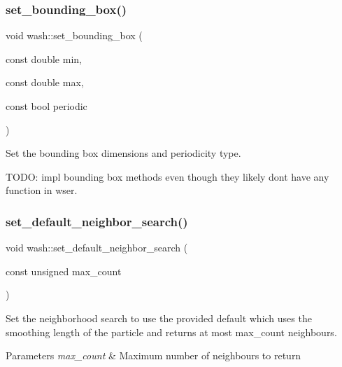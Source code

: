 \subsubsection{\texorpdfstring{set\+\_\+bounding\+\_\+box()}{set\_bounding\_box()}}
{\footnotesize\ttfamily void wash\+::set\+\_\+bounding\+\_\+box (\begin{DoxyParamCaption}\item[{const double}]{min,  }\item[{const double}]{max,  }\item[{const bool}]{periodic }\end{DoxyParamCaption})}



Set the bounding box dimensions and periodicity type. 

T\+O\+DO\+: impl bounding box methods even though they likely don\textquotesingle{}t have any function in wser. \mbox{\label{namespacewash_abc2e79908c969eabb61a865c8f279d02}} 
\subsubsection{\texorpdfstring{set\+\_\+default\+\_\+neighbor\+\_\+search()}{set\_default\_neighbor\_search()}}
{\footnotesize\ttfamily void wash\+::set\+\_\+default\+\_\+neighbor\+\_\+search (\begin{DoxyParamCaption}\item[{const unsigned}]{max\+\_\+count }\end{DoxyParamCaption})}



Set the neighborhood search to use the provided default which uses the smoothing length of the particle and returns at most max\+\_\+count neighbours. 


\begin{DoxyParams}{Parameters}
{\em max\+\_\+count} & Maximum number of neighbours to return \\
\hline
\end{DoxyParams}
\mbox{\label{namespacewash_a6b9608d3d8934431c9ab6af488992f10}} 
